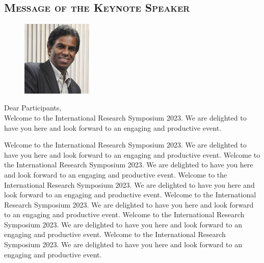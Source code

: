\thispagestyle{fancy}
	
	\vspace{-2em} %
	\begin{center}



\subsection*{\textsc{Message of the Keynote Speaker}}
	\end{center}

   
    
    \begin{figure}
		\includegraphics[width=0.3\textwidth]{Images/Keynote.jpeg}
	\end{figure}
	\vspace{2em} %




	
	\noindent	Dear Participants,\\
	
	\noindent
	Welcome to the International Research Symposium 2023. We are delighted to have you here and look forward to an engaging and productive event. 
	
	Welcome to the International Research Symposium 2023. We are delighted to have you here and look forward to an engaging and productive event. Welcome to the International Research Symposium 2023. We are delighted to have you here and look forward to an engaging and productive event. Welcome to the International Research Symposium 2023. We are delighted to have you here and look forward to an engaging and productive event. Welcome to the International Research Symposium 2023. We are delighted to have you here and look forward to an engaging and productive event. Welcome to the International Research Symposium 2023. We are delighted to have you here and look forward to an engaging and productive event. Welcome to the International Research Symposium 2023. We are delighted to have you here and look forward to an engaging and productive event. 
	
